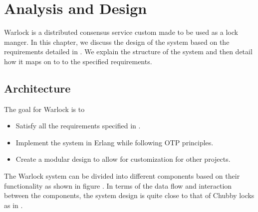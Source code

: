 \chapter{Analysis and Design}
\label{chapter:analysis.design}

Warlock is a distributed consensus service custom made to be used as a
lock manger. In this chapter, we discuss the design of the system based on the
requirements detailed in . We explain the structure
of the system and then detail how it maps on to to the specified requirements.

\section{Architecture}

The goal for Warlock is to

\begin{itemize}
  \item Satisfy all the requirements specified in .
  \item Implement the system in Erlang while following OTP principles.
  \item Create a modular design to allow for customization for other projects.
\end{itemize}

The Warlock system can be divided into different components based on their
functionality as shown in figure . In terms of the
data flow and interaction between the components, the system design is quite
close to that of Chubby locks \citep{Burrows06} as in
.

